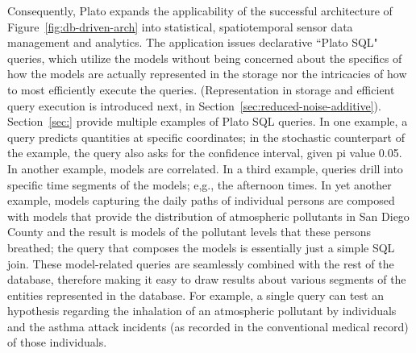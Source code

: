 Consequently, Plato expands the applicability of the successful architecture of Figure~\ref{fig:db-driven-arch} into statistical, spatiotemporal sensor data management and analytics. The application issues declarative ``Plato SQL" queries, which utilize the models without being concerned about the specifics of how the models are actually represented in the storage nor the intricacies of how to most efficiently execute the queries. (Representation in storage and efficient query execution is introduced next, in Section~\ref{sec:reduced-noise-additive}).  Section~\ref{sec:} provide multiple examples of Plato SQL queries. In one example, a query predicts quantities at specific coordinates; in the stochastic counterpart of the example, the query also asks for the confidence interval, given pi value 0.05. In another example, models are correlated. In a third example, queries drill into specific time segments of the models; e,g., the afternoon times. In yet another example, models capturing the daily paths of individual persons are composed with models that provide the distribution of atmospheric pollutants in San Diego County and the result is models of the pollutant levels that these persons breathed; the query that composes the models is essentially just a simple SQL join. These model-related queries are seamlessly combined with the rest of the database, therefore making it easy to draw results about various segments of the entities represented in the database. For example, a single query can test an hypothesis regarding the inhalation of an atmospheric pollutant by individuals and the asthma attack incidents (as recorded in the conventional medical record) of those individuals.

